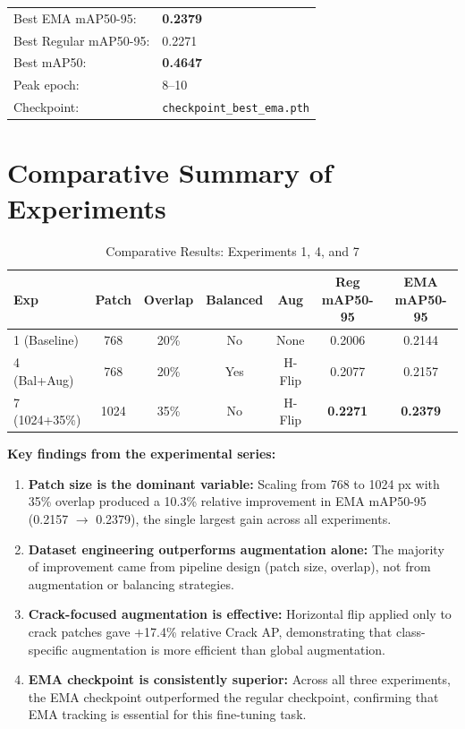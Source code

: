 \begin{resultbox}
\begin{tabular}{ll}
Best EMA mAP50-95:     & \textbf{0.2379} \\
Best Regular mAP50-95: & 0.2271 \\
Best mAP50:            & \textbf{0.4647} \\
Peak epoch:            & 8--10 \\
Checkpoint:            & \texttt{checkpoint\_best\_ema.pth} \\
\end{tabular}
\end{resultbox}

\section{Comparative Summary of Experiments}

\begin{table}[H]
\centering
\caption{Comparative Results: Experiments 1, 4, and 7}
\begin{tabular}{lcccccc}
\toprule
\rowcolor{tableHeader}\tableheadfont Exp & \tableheadfont Patch & \tableheadfont Overlap & \tableheadfont Balanced & \tableheadfont Aug & \tableheadfont Reg mAP50-95 & \tableheadfont EMA mAP50-95 \\
\midrule
1 (Baseline)  & 768  & 20\% & No  & None   & 0.2006 & 0.2144 \\
\rowcolor{tableRowAlt}4 (Bal+Aug)   & 768  & 20\% & Yes & H-Flip & 0.2077 & 0.2157 \\
7 (1024+35\%) & 1024 & 35\% & No  & H-Flip & \textbf{0.2271} & \textbf{0.2379} \\
\bottomrule
\end{tabular}
\end{table}

\begin{conclusionbox}
\textbf{Key findings from the experimental series:}
\begin{enumerate}[leftmargin=2em]
    \item \textbf{Patch size is the dominant variable:} Scaling from 768 to 1024 px with 35\% overlap produced a 10.3\% relative improvement in EMA mAP50-95 (0.2157 $\to$ 0.2379), the single largest gain across all experiments.
    \item \textbf{Dataset engineering outperforms augmentation alone:} The majority of improvement came from pipeline design (patch size, overlap), not from augmentation or balancing strategies.
    \item \textbf{Crack-focused augmentation is effective:} Horizontal flip applied only to crack patches gave $+$17.4\% relative Crack AP, demonstrating that class-specific augmentation is more efficient than global augmentation.
    \item \textbf{EMA checkpoint is consistently superior:} Across all three experiments, the EMA checkpoint outperformed the regular checkpoint, confirming that EMA tracking is essential for this fine-tuning task.
\end{enumerate}
\end{conclusionbox}

